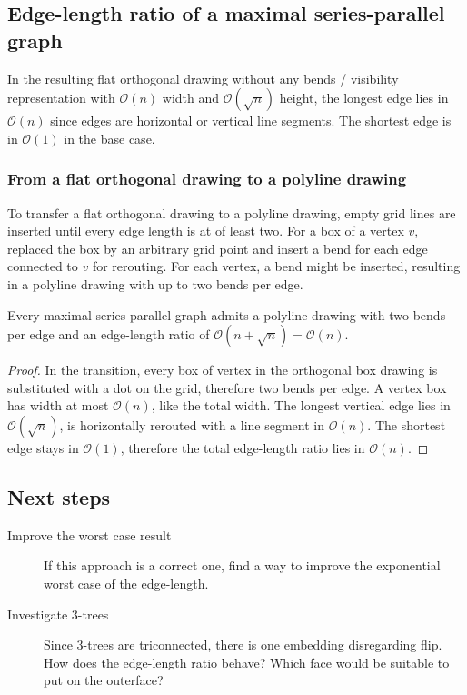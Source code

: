 \subsection{Edge-length ratio of a maximal series-parallel graph}
In the resulting flat orthogonal drawing without any bends / visibility representation with $\mathcal{O}(n)$ width and $\mathcal{O}(\sqrt{n})$ height, the longest edge lies in $\mathcal{O}(n)$ since edges are horizontal or vertical line segments. The shortest edge is in $\mathcal{O}(1)$ in the base case.
\subsubsection{From a flat orthogonal drawing to a polyline drawing}
To transfer a flat orthogonal drawing to a polyline drawing, empty grid lines are inserted until every edge length is at of least two. For a box of a vertex $v$, replaced the box by an arbitrary grid point and insert a bend for each edge connected to $v$ for rerouting. For each vertex, a bend might be inserted, resulting in a polyline drawing with up to two bends per edge.
\begin{lemma}
	Every maximal series-parallel graph admits a polyline drawing with two bends per edge and an edge-length ratio of $\mathcal{O}(n + \sqrt{n}) = \mathcal{O}(n)$.
\end{lemma}
\begin{proof}
	In the transition, every box of vertex in the orthogonal box drawing is substituted with a dot on the grid, therefore two bends per edge. A vertex box has width at most $\mathcal{O}(n)$, like the total width. The longest vertical edge lies in $\mathcal{O}(\sqrt{n})$, is horizontally rerouted with a line segment in $\mathcal{O}(n)$. The shortest edge stays in $\mathcal{O}(1)$, therefore the total edge-length ratio lies in $\mathcal{O}(n)$.
\end{proof}
\subsection{Next steps}
\begin{description}
	\item[Improve the worst case result] If this approach is a correct one, find a way to improve the exponential worst case of the edge-length. 
	\item[Investigate 3-trees] Since 3-trees are triconnected, there is one embedding disregarding flip. How does the edge-length ratio behave? Which face would be suitable to put on the outerface?
\end{description}

